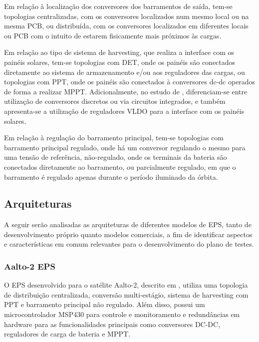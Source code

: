 Em relação à localização dos conversores dos barramentos de saída, tem-se topologias centralizadas, com os conversores localizados num mesmo local ou na mesma PCB, ou distribuída, com os conversores localizados em diferentes locais ou PCB com o intuito de estarem fisicamente mais próximos às cargas.

Em relação ao tipo de sistema de harvesting, que realiza a interface com os painéis solares, tem-se topologias com \gls{DET}, onde os painéis são conectados diretamente ao sistema de armazenamento e/ou aos reguladores das cargas, ou topologias com \gls{PPT}, onde os painéis são conectados à conversores dc-dc operados de forma a realizar \gls{MPPT}.
Adicionalmente, no estudo de \textcite{sara-review-eps}, diferenciam-se entre utilização de conversores discretos ou via circuitos integrados, e também apresenta-se a utilização de reguladores VLDO para a interface com os painéis solares.

Em relação à regulação do barramento principal, tem-se topologias com barramento principal regulado, onde há um conversor regulando o mesmo para uma tensão de referência, não-regulado, onde os terminais da bateria são conectados diretamente ao barramento, ou parcialmente regulado, em que o barramento é regulado apenas durante o período iluminado da órbita.



\subsection{Arquiteturas}\label{sec:arquiteturas}

A seguir serão analisadas as arquiteturas de diferentes modelos de \gls{EPS}, tanto de desenvolvimento próprio quanto modelos comerciais, a fim de identificar aspectos e características em comum relevantes para o desenvolvimento do plano de testes.

\subsubsection{Aalto-2 EPS}

O \gls{EPS} desenvolvido para o satélite Aalto-2, descrito em \textcite{aalto-eps}, utiliza uma topologia de distribuição centralizada, conversão multi-estágio, sistema de harvesting com \gls{PPT} e barramento principal não regulado.
Além disso, possui um microcontrolador MSP430 para controle e monitoramento e redundâncias em hardware para as funcionalidades principais como conversores DC-DC, reguladores de carga de bateria e \gls{MPPT}.

